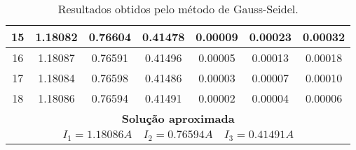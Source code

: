 \documentclass[a4paper,11pt, twoside]{article}
\newcommand{\n}[1]{\textbf{#1}}
\begin{document}
{\begin{table}[!th]
\begin{center}
\begin{tabular}{ c c c c c c c }
                \midrule
                15 & 1.18082 & 0.76604 & 0.41478 & 0.00009  & 0.00023  & 0.00032 \\
                \midrule
                16 & 1.18087 & 0.76591 & 0.41496 & 0.00005  & 0.00013  & 0.00018 \\
                \midrule
                17 & 1.18084 & 0.76598 & 0.41486 & 0.00003  & 0.00007  & 0.00010 \\
                \midrule
                18 & 1.18086 & 0.76594 & 0.41491 & 0.00002  & 0.00004  & 0.00006 \\
                \toprule[0.11em]
                \multicolumn{7}{c}{\n{Solução aproximada}}\\
                \toprule[0.11em]
                \multicolumn{7}{c}{$I_1 = 1.18086A\quad I_2 = 0.76594A\quad I_3 = 0.41491A$}\\
                \midrule
            \end{tabular}
        \end{center}
        \caption{Resultados obtidos pelo método de Gauss-Seidel.}\label{tab1}
    \end{table}}
    
\end{document}
